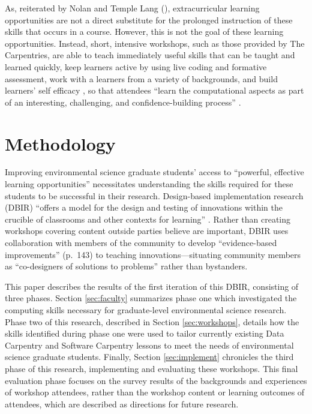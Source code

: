 \documentclass[12pt]{article}
\begin{document}
\quad As, reiterated by Nolan and Temple Lang (\citeyear{esr}), extracurricular
learning opportunities are not a direct substitute for the prolonged instruction
of these skills that occurs in a course. However, this is not the goal 
of these learning opportunities. Instead, short, intensive workshops, such as
those provided by The Carpentries, are able to teach immediately useful skills
that can be taught and learned quickly, keep learners active by using live
coding and formative assessment, work with a learners from a variety of
backgrounds, and build learners' self efficacy \citep{null-carpentries}, so that
attendees ``learn the computational aspects as part of an interesting, 
challenging, and confidence-building process'' \citep[p.\ 101]{nolan}.

\section{Methodology}

\quad Improving environmental science graduate students' access to ``powerful,
effective learning opportunities'' \citep[p.\ 137]{penuel} necessitates
understanding the skills required for these students to be successful in their
research. Design-based implementation research (DBIR) \citep{confrey, penuel,
oneill} ``offers a model for the design and testing of innovations
within the crucible of classrooms and other contexts for learning'' 
\citep[p.\ 140]{penuel}. Rather than creating workshops covering content outside
parties believe are important, DBIR uses collaboration with members of the
community to develop ``evidence-based improvements'' (p.\ 143) to teaching 
innovations---situating community members as ``co-designers of solutions to 
problems'' \citep[p.\ 140]{penuel} rather than bystanders. 

\quad This paper describes the results of the first iteration of this DBIR, 
consisting of three phases. Section \ref{sec:faculty} summarizes phase one which 
investigated the computing skills necessary for graduate-level environmental
science research. Phase two of this research, described in Section 
\ref{sec:workshops}, details how the skills identified during phase one were
used to tailor currently existing Data Carpentry \citeyear{data-carpentry} and
Software Carpentry \citeyear{software-carpentry} lessons to meet the needs of
environmental science graduate students. Finally, Section \ref{sec:implement}
chronicles the third phase of this research, implementing and evaluating these
workshops. This final evaluation phase focuses on the survey results of the 
backgrounds and experiences of workshop attendees, rather than the workshop
content or learning outcomes of attendees, which are described as directions for
future research. 
\end{document}
